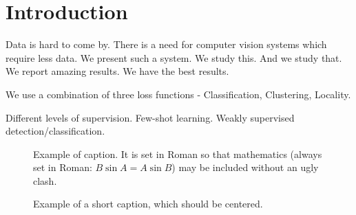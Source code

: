 \section{Introduction}

Data is hard to come by. There is a need for computer vision systems which require less data. We
present such a system. We study this. And we study that. We report amazing results. We have the best
results. 

We use a combination of three loss functions - Classification, Clustering, Locality. 

Different levels of supervision. Few-shot learning. Weakly supervised detection/classification.


\begin{figure}[t]
\begin{center}
\fbox{\rule{0pt}{2in} \rule{0.9\linewidth}{0pt}}
\end{center}
   \caption{Example of caption.  It is set in Roman so that mathematics
   (always set in Roman: $B \sin A = A \sin B$) may be included without an
   ugly clash.}
\label{fig:long}
\label{fig:onecol}
\end{figure}


\begin{figure*}
\begin{center}
\fbox{\rule{0pt}{2in} \rule{.9\linewidth}{0pt}}
\end{center}
   \caption{Example of a short caption, which should be centered.}
\label{fig:short}
\end{figure*}

